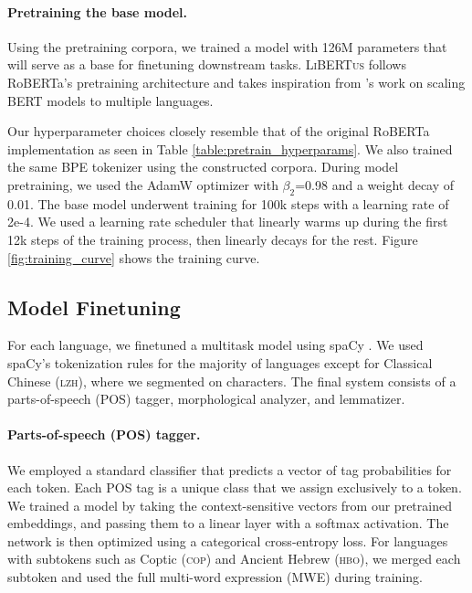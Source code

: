 \documentclass[11pt]{article}
\newcommand{\libertus}{\textsc{LiBERTus}}
\begin{document}
\paragraph{Pretraining the base model.}
Using the pretraining corpora, we trained a model with 126M parameters that will serve as a base for finetuning downstream tasks.
\libertus{} follows RoBERTa's pretraining architecture \cite{liu-etal-2019-roberta} and takes inspiration from \citet{conneau-etal-2020-unsupervised}'s work on scaling BERT models to multiple languages.



Our hyperparameter choices closely resemble that of the original RoBERTa implementation as seen in Table \ref{table:pretrain_hyperparams}.
We also trained the same BPE tokenizer \citep{sennrich-etal-2016-neural} using the constructed corpora.
During model pretraining, we used the AdamW optimizer with $\beta_2$=0.98 and a weight decay of 0.01.
The base model underwent training for 100k steps with a learning rate of 2e-4.
We used a learning rate scheduler that linearly warms up during the first 12k steps of the training process, then linearly decays for the rest.
Figure \ref{fig:training_curve} shows the training curve.

\subsection{Model Finetuning}

For each language, we finetuned a multitask model using spaCy \cite{honnibal-etal-2020-spacy}.
We used spaCy's tokenization rules for the majority of languages except for Classical Chinese (\textsc{lzh}), where we segmented on characters.
The final system consists of a parts-of-speech (POS) tagger, morphological analyzer, and lemmatizer.

\paragraph{Parts-of-speech (POS) tagger.}
We employed a standard classifier that predicts a vector of tag probabilities for each token.
Each POS tag is a unique class that we assign exclusively to a token.
We trained a model by taking the context-sensitive vectors from our pretrained embeddings, and passing them to a linear layer with a softmax activation.
The network is then optimized using a categorical cross-entropy loss.
For languages with subtokens such as Coptic (\textsc{cop}) and Ancient Hebrew (\textsc{hbo}), we merged each subtoken and used the full multi-word expression (MWE) during training.
\end{document}
